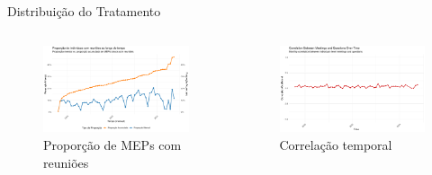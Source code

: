 \documentclass[aspectratio=169]{beamer}
\begin{document}
\begin{frame}{Distribuição do Tratamento}
\begin{columns}
\begin{column}{0.5\textwidth}
\begin{figure}
\centering
\includegraphics[width=\textwidth]{figures/fig2_proportion_meetings.pdf}
\caption{Proporção de MEPs com reuniões}
\end{figure}
\end{column}
\begin{column}{0.5\textwidth}
\begin{figure}
\centering
\includegraphics[width=\textwidth]{figures/fig3_correlation_meetings_questions.pdf}
\caption{Correlação temporal}
\end{figure}
\end{column}
\end{columns}
\end{frame}
\end{document}
